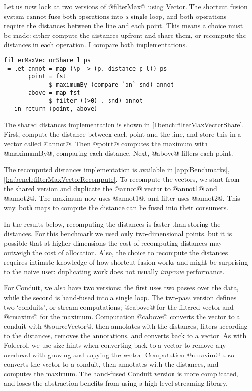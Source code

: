 Let us now look at two versions of @filterMax@ using Vector.
The shortcut fusion system cannot fuse both operations into a single loop, and both operations require the distances between the line and each point.
This means a choice must be made: either compute the distances upfront and share them, or recompute the distances in each operation.
I compare both implementations.

\begin{lstlisting}[float,label=l:bench:filterMaxVectorShare,caption=Vector / share implementation of filterMax]
filterMaxVectorShare l ps
 = let annot = map (\p -> (p, distance p l)) ps
       point = fst
             $ maximumBy (compare `on` snd) annot
       above = map fst
             $ filter ((>0) . snd) annot
   in return (point, above)
\end{lstlisting}

The shared distances implementation is shown in \autoref{l:bench:filterMaxVectorShare}.
First, compute the distance between each point and the line, and store this in a vector called @annot@.
Then @point@ computes the maximum with @maximumBy@, comparing each distance.
Next, @above@ filters each point.

The recomputed distances implementation is available in \autoref{app:Benchmarks}, \autoref{l:a:bench:filterMaxVectorRecompute}.
To recompute the vectors, we start from the shared version and duplicate the @annot@ vector to @annot1@ and @annot2@. The maximum now uses @annot1@, and filter uses @annot2@.
This way, both maps to compute the distance can be fused into their consumers.

In the results below, recomputing the distances is faster than storing the distances.
For this benchmark we used only two-dimensional points, but it is possible that at higher dimensions the cost of recomputing distances may outweigh the cost of allocation.
Also, the choice to recompute the distances requires intimate knowledge of how shortcut fusion works and might be surprising to the naive user: duplicating work does not usually \emph{improve} performance.

For Conduit, we also have two versions: the first uses two passes over the data, while the second is hand-fused into a single loop.
The two-pass version defines two `conduits', or stream computations; @cabove@ for the filtered vector and @cmaxim@ for the maximum.
Computation @cabove@ converts the vector to a conduit with @sourceVector@, then annotates with the distances, filters according to the distances, removes the annotations, and converts back to a vector.
As with Folderol, we use size hints when converting back to a vector to remove any overhead with growing and copying the vector.
Computation @cmaxim@ also converts the vector to a conduit, then annotates with the distances, and computes the maximum.
The hand-fused Conduit version is more complicated, and loses the abstraction benefits from using a high-level streaming library.

